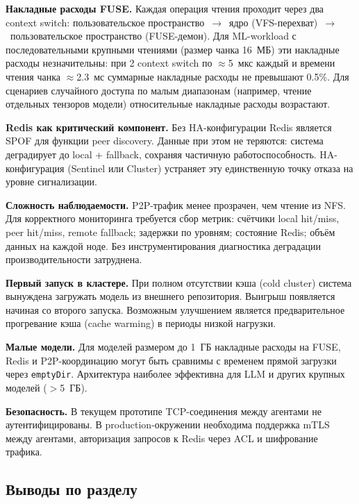 \textbf{Накладные расходы FUSE.} Каждая операция чтения проходит через два context switch: пользовательское пространство~$\to$~ядро (VFS-перехват)~$\to$~пользовательское пространство (FUSE-демон). Для ML-workload с последовательными крупными чтениями (размер чанка 16~МБ) эти накладные расходы незначительны: при 2 context switch по $\approx$5~мкс каждый и времени чтения чанка $\approx$2.3~мс суммарные накладные расходы не превышают 0.5\%. Для сценариев случайного доступа по малым диапазонам (например, чтение отдельных тензоров модели) относительные накладные расходы возрастают.

\textbf{Redis как критический компонент.} Без HA-конфигурации Redis является SPOF для функции peer discovery. Данные при этом не теряются: система деградирует до local + fallback, сохраняя частичную работоспособность. HA-конфигурация (Sentinel или Cluster) устраняет эту единственную точку отказа на уровне сигнализации.

\textbf{Сложность наблюдаемости.} P2P-трафик менее прозрачен, чем чтение из NFS. Для корректного мониторинга требуется сбор метрик: счётчики local hit/miss, peer hit/miss, remote fallback; задержки по уровням; состояние Redis; объём данных на каждой ноде. Без инструментирования диагностика деградации производительности затруднена.

\textbf{Первый запуск в кластере.} При полном отсутствии кэша (cold cluster) система вынуждена загружать модель из внешнего репозитория. Выигрыш появляется начиная со второго запуска. Возможным улучшением является предварительное прогревание кэша (cache warming) в периоды низкой нагрузки.

\textbf{Малые модели.} Для моделей размером до 1~ГБ накладные расходы на FUSE, Redis и P2P-координацию могут быть сравнимы с временем прямой загрузки через \texttt{emptyDir}. Архитектура наиболее эффективна для LLM и других крупных моделей ($>$5~ГБ).

\textbf{Безопасность.} В текущем прототипе TCP-соединения между агентами не аутентифицированы. В production-окружении необходима поддержка mTLS между агентами, авторизация запросов к Redis через ACL и шифрование трафика.

\subsection{Выводы по разделу}

